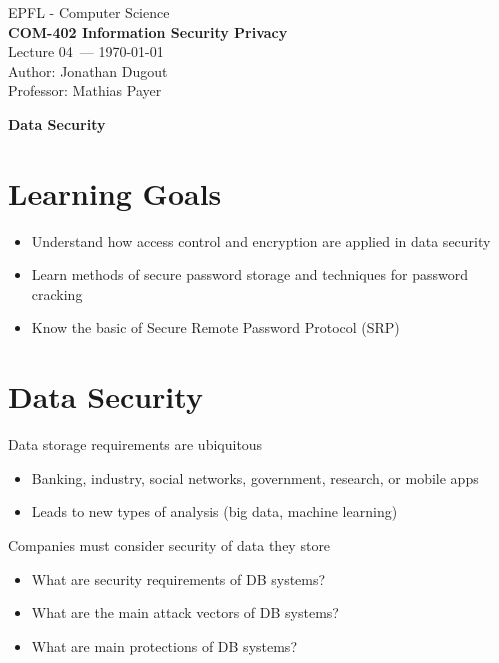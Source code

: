 \documentclass[11pt]{article}
\newcommand{\coursename}{COM-402 Information Security Privacy}
\newcommand{\lecturenum}{04}
\newcommand{\lecturedate}{\today}
\newcommand{\professor}{Mathias Payer}
\begin{document}
\begin{center}
  {\large EPFL - Computer Science} \\[0.5em]
  {\Large \textbf{\coursename}} \\[0.5em]
  {\large Lecture \lecturenum\ --- \lecturedate} \\[0.5em]
  {\large Author: Jonathan Dugout} \\[0.5em]
  {\large Professor: \professor} \\[0.5em]
\end{center}

\vspace{2cm}

\begin{center}
	{\LARGE \textbf{Data Security}}
\end{center}

\vspace{1cm}

\section*{Learning Goals}
\begin{itemize}
	\item Understand how access control and encryption are applied in data security
	\item Learn methods of secure password storage and techniques for password cracking
	\item Know the basic of Secure Remote Password Protocol (SRP)
\end{itemize}

\section*{Data Security}
Data storage requirements are ubiquitous 
\begin{itemize}
	\item Banking, industry, social networks, government, research, or mobile apps
	\item Leads to new types of analysis (big data, machine learning)
\end{itemize}

Companies must consider security of data they store
\begin{itemize}
	\item What are security requirements of DB systems?
	\item What are the main attack vectors of DB systems?
	\item What are main protections of DB systems?
\end{itemize}
\end{document}
